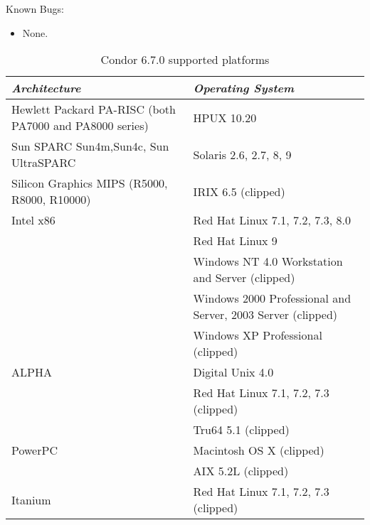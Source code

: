 \noindent Known Bugs:

\begin{itemize}

\item None.

\end{itemize}
\begin{center}
\begin{table}[hbt]
\begin{tabular}{|ll|} \hline
\emph{Architecture} & \emph{Operating System} \\ \hline \hline
Hewlett Packard PA-RISC (both PA7000 and PA8000 series) & HPUX 10.20 \\ \hline
Sun SPARC Sun4m,Sun4c, Sun UltraSPARC & Solaris 2.6, 2.7, 8, 9 \\ \hline
Silicon Graphics MIPS (R5000, R8000, R10000) & IRIX 6.5 (clipped) \\ \hline
Intel x86 & Red Hat Linux 7.1, 7.2, 7.3, 8.0 \\
 & Red Hat Linux 9 \\
 & Windows NT 4.0 Workstation and Server (clipped) \\
 & Windows 2000 Professional and Server, 2003 Server (clipped) \\
 & Windows XP Professional (clipped) \\ \hline
ALPHA & Digital Unix 4.0 \\
 & Red Hat Linux 7.1, 7.2, 7.3 (clipped) \\
 & Tru64 5.1 (clipped) \\ \hline
PowerPC & Macintosh OS X (clipped) \\
 & AIX 5.2L (clipped) \\ \hline
Itanium & Red Hat Linux 7.1, 7.2, 7.3 (clipped) \\ \hline
\end{tabular}
\caption{\label{supported-platforms}Condor 6.7.0 supported platforms}
\end{table}
\end{center}
